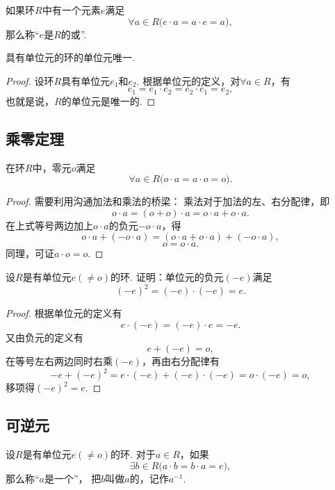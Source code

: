 \begin{definition}
如果环\(R\)中有一个元素\(e\)满足\[
    \forall a \in R \bigl( e \cdot a = a \cdot e = a \bigr),
\]
那么称“\(e\)是\(R\)的或”.
\end{definition}

\begin{property}
具有单位元的环的单位元唯一.
\begin{proof}
设环\(R\)具有单位元\(e_1\)和\(e_2\).
根据单位元的定义，对\(\forall a \in R\)，有\[
    e_1 = e_1 \cdot e_2 = e_2 \cdot e_1 = e_2,
\]
也就是说，\(R\)的单位元是唯一的.
\end{proof}
\end{property}

\subsection{乘零定理}
\begin{theorem}[乘零定理]
在环\(R\)中，零元\(o\)满足\[
    \forall a \in R \bigl( o \cdot a = a \cdot o = o \bigr).
\]
\begin{proof}
需要利用沟通加法和乘法的桥梁：
乘法对于加法的左、右分配律，即\[
    o \cdot a = (o + o) \cdot a = o \cdot a + o \cdot a.
\]在上式等号两边加上\(o \cdot a\)的负元\(-o \cdot a\)，得\[
    o \cdot a + (- o \cdot a) = (o \cdot a + o \cdot a) + (- o \cdot a),
\]\[
    o = o \cdot a.
\]
同理，可证\(a \cdot o = o\).
\end{proof}
\end{theorem}

\begin{example}
设\(R\)是有单位元\(e(\neq o)\)的环.
证明：单位元的负元\((-e)\)满足\[
    (-e)^2=(-e)\cdot(-e)=e.
\]
\begin{proof}
根据单位元的定义有\[
    e \cdot (-e) = (-e) \cdot e = -e.
\]又由负元的定义有\[
    e + (-e) = o,
\]在等号左右两边同时右乘\((-e)\)，再由右分配律有\[
    -e + (-e)^2 = e \cdot (-e) + (-e) \cdot (-e) = o \cdot (-e) = o,
\]
移项得\((-e)^2 = e\).
\end{proof}
\end{example}

\subsection{可逆元}
\begin{definition}
设\(R\)是有单位元\(e(\neq o)\)的环.
对于\(a \in R\)，如果\[
    \exists b \in R \bigl( a \cdot b = b \cdot a = e \bigr),
\]那么称“\(a\)是一个”，
把\(b\)叫做\(a\)的，记作\(a^{-1}\).
\end{definition}

